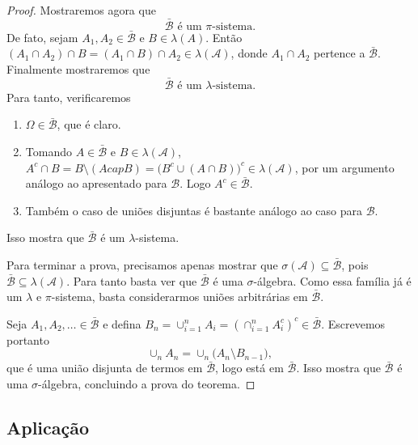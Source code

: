 \documentclass[reqno]{article}
\newcommand*\1{\mathds{1}}
\begin{document}
\begin{proof}
  Mostraremos agora que
  \begin{equation}
    \label{e:B_barra_pi}
    \text{$\bar{\mathcal{B}}$ é um $\pi$-sistema}.
  \end{equation}
  De fato, sejam $A_1, A_2 \in \bar{\mathcal{B}}$ e $B \in \lambda(A)$.
  Então $(A_1 \cap A_2) \cap B = (A_1 \cap B) \cap A_2 \in \lambda(\mathcal{A})$, donde $A_1 \cap A_2$ pertence a $\bar{\mathcal{B}}$.
  Finalmente mostraremos que
  \begin{equation}
    \label{e:B_barra_lambda}
    \text{$\bar{\mathcal{B}}$ é um $\lambda$-sistema}.
  \end{equation}
  Para tanto, verificaremos
  \begin{enumerate}
  \item $\Omega \in \bar{\mathcal{B}}$, que é claro.
  \item Tomando $A \in \bar{\mathcal{B}}$ e $B \in \lambda(\mathcal{A})$, $A^c \cap B = B \setminus (A cap B) = \big(B^c \cup (A \cap B)\big)^c \in \lambda(\mathcal{A})$, por um argumento análogo ao apresentado para $\mathcal{B}$.
    Logo $A^c \in \bar{\mathcal{B}}$.
  \item Também o caso de uniões disjuntas é bastante análogo ao caso para $\mathcal{B}$.
  \end{enumerate}
  Isso mostra que $\bar{\mathcal{B}}$ é um $\lambda$-sistema.

  Para terminar a prova, precisamos apenas mostrar que $\sigma(\mathcal{A}) \subseteq \bar{\mathcal{B}}$, pois $\bar{\mathcal{B}} \subseteq \lambda(\mathcal{A})$.
  Para tanto basta ver que $\bar{\mathcal{B}}$ é uma $\sigma$-álgebra.
  Como essa família já é um $\lambda$ e $\pi$-sistema, basta considerarmos uniões arbitrárias em $\bar{\mathcal{B}}$.

  Seja $A_1, A_2, \dots \in \bar{\mathcal{B}}$ e defina $B_n = \cup_{i=1}^n A_i = (\cap_{i=1}^n A_i^c)^c \in \bar{\mathcal{B}}$.
  Escrevemos portanto
  \begin{equation}
    \cup_n A_n = \cup_n \big(A_n \setminus B_{n-1} \big),
  \end{equation}
  que é uma união disjunta de termos em $\bar{\mathcal{B}}$, logo está em $\bar{\mathcal{B}}$.
  Isso mostra que $\bar{\mathcal{B}}$ é uma $\sigma$-álgebra, concluindo a prova do teorema.
\end{proof}

\subsection{Aplicação}
\end{document}

